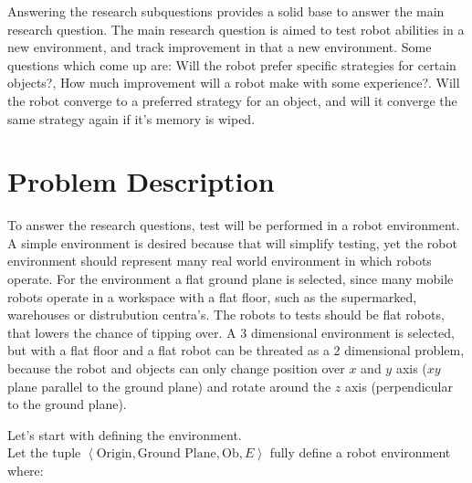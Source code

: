Answering the research subquestions provides a solid base to answer the main research question. The main research question is aimed to test robot abilities in a new environment, and track improvement in that a new environment. Some questions which come up are: Will the robot prefer specific strategies for certain objects?, How much improvement will a robot make with some experience?. Will the robot converge to a preferred strategy for an object, and will it converge the same strategy again if it's memory is wiped.\bs

\section{Problem Description}%
\label{sec:problem_description}
To answer the research questions, test will be performed in a robot environment. A simple environment is desired because that will simplify testing, yet the robot environment should represent many real world environment in which robots operate. For the environment a flat ground plane is selected, since many mobile robots operate in a workspace with a flat floor, such as the supermarked, warehouses or distrubution centra's. The robots to tests should be flat robots, that lowers the chance of tipping over. A 3 dimensional environment is selected, but with a flat floor and a flat robot can be threated as a 2 dimensional problem, because the robot and objects can only change position over $x$ and $y$ axis ($xy$ plane parallel to the ground plane) and rotate around the $z$ axis (perpendicular to the ground plane).\bs

Let's start with defining the environment.\\Let the tuple $\left\langle \text{Origin}, \text{Ground Plane}, \text{Ob}, E \right\rangle$ fully define a robot environment where:\bs

